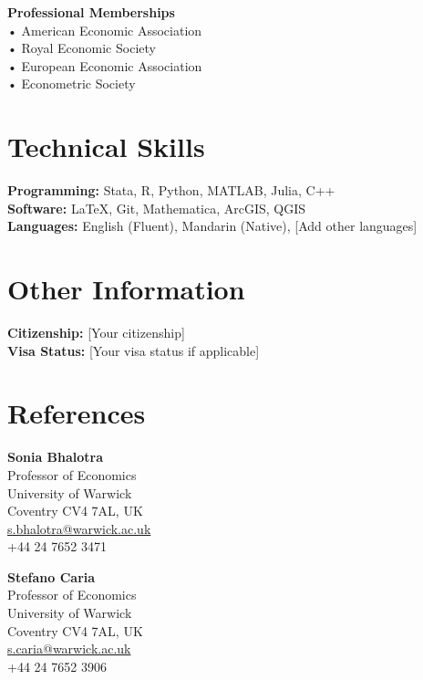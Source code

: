 \documentclass[11pt,a4paper]{article}
\begin{document}
\textbf{Professional Memberships} \\
• American Economic Association \\
• Royal Economic Society \\
• European Economic Association \\
• Econometric Society \\

\section{Technical Skills}
\textbf{Programming:} Stata, R, Python, MATLAB, Julia, C++ \\
\textbf{Software:} LaTeX, Git, Mathematica, ArcGIS, QGIS \\
\textbf{Languages:} English (Fluent), Mandarin (Native), [Add other languages] \\

\section{Other Information}
\textbf{Citizenship:} [Your citizenship] \\
\textbf{Visa Status:} [Your visa status if applicable] \\

\section{References}

\begin{minipage}[t]{0.48\textwidth}
\textbf{Sonia Bhalotra} \\
Professor of Economics \\
University of Warwick \\
Coventry CV4 7AL, UK \\
\href{mailto:s.bhalotra@warwick.ac.uk}{s.bhalotra@warwick.ac.uk} \\
+44 24 7652 3471
\end{minipage}
\hfill
\begin{minipage}[t]{0.48\textwidth}
\textbf{Stefano Caria} \\
Professor of Economics \\
University of Warwick \\
Coventry CV4 7AL, UK \\
\href{mailto:s.caria@warwick.ac.uk}{s.caria@warwick.ac.uk} \\
+44 24 7652 3906
\end{minipage}
\end{document}
